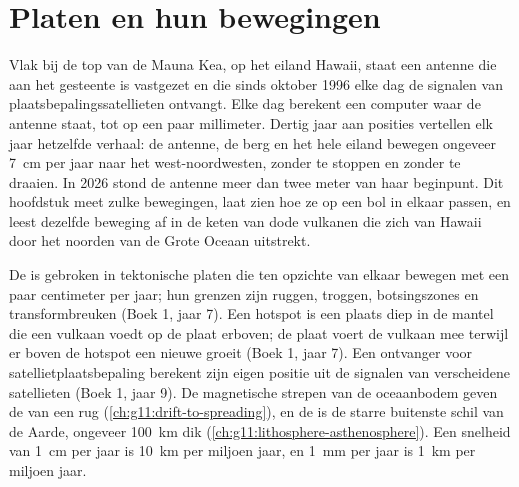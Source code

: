 \chapter{Platen en hun bewegingen}\label{ch:g11:plate-motions}

Vlak bij de top van de Mauna Kea, op het eiland Hawaii, staat een antenne die aan
het gesteente is vastgezet en die sinds oktober 1996 elke dag de signalen van
plaatsbepalingssatellieten ontvangt. Elke dag berekent een computer waar de
antenne staat, tot op een paar millimeter. Dertig jaar aan posities vertellen elk
jaar hetzelfde verhaal: de antenne, de berg en het hele eiland bewegen ongeveer
\qty{7}{cm} per jaar naar het west-noordwesten, zonder te stoppen en zonder te
draaien. In 2026 stond de antenne meer dan twee meter van haar beginpunt. Dit
hoofdstuk meet zulke bewegingen, laat zien hoe ze op een bol in elkaar passen, en
leest dezelfde beweging af in de keten van dode vulkanen die zich van Hawaii
door het noorden van de Grote Oceaan uitstrekt.

\begin{recall}
De  is gebroken in tektonische platen die ten opzichte van elkaar
bewegen met een paar centimeter per jaar; hun grenzen zijn ruggen, troggen,
botsingszones en transformbreuken (Boek 1, jaar 7). Een hotspot is een plaats
diep in de mantel die een vulkaan voedt op de plaat erboven; de plaat voert de
vulkaan mee terwijl er boven de hotspot een nieuwe groeit (Boek 1,
jaar 7). Een ontvanger voor satellietplaatsbepaling berekent zijn eigen positie
uit de signalen van verscheidene satellieten (Boek 1, jaar 9). De magnetische strepen
van de oceaanbodem geven de  van een rug
(\cref{ch:g11:drift-to-spreading}), en de  is de starre buitenste
schil van de Aarde, ongeveer \qty{100}{km} dik
(\cref{ch:g11:lithosphere-asthenosphere}). Een snelheid van \qty{1}{cm} per jaar is
\qty{10}{km} per miljoen jaar, en \qty{1}{mm} per jaar is \qty{1}{km} per
miljoen jaar.
\end{recall}

